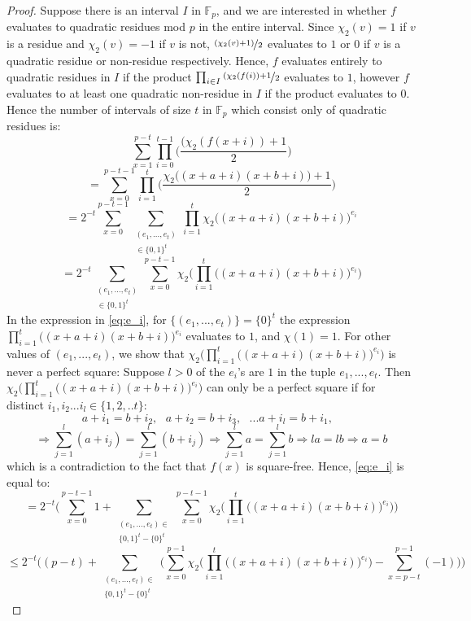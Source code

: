 \documentclass{report}
\begin{document}
\begin{proof}
Suppose there is an interval $I$ in $\mathbb{F}_p$, and we are interested in whether $f$ evaluates to quadratic residues mod $p$ in the entire interval. Since $\chi_2(v)=1$ if $v$ is a residue and $\chi_2(v)=-1$ if $v$ is not, $\nicefrac{(\chi_2(v)+1)}{2}$ evaluates to $1$ or $0$ if $v$ is a quadratic residue or non-residue respectively. Hence, $f$ evaluates entirely to quadratic residues in $I$ if the product $\prod_{i\in I}\nicefrac{(\chi_2(f(i))+1}{2}$ evaluates to $1$, however $f$ evaluates to at least one quadratic non-residue in $I$ if the product evaluates to $0$. Hence the number of intervals of size $t$ in $\mathbb{F}_p$ which consist only of quadratic residues is:
\[ \sum_{x=1}^{p-t}\prod_{i=0}^{t-1}\bigg(\frac{(\chi_2(f(x+i))+1}{2}\bigg) \]
\[ =\sum_{x=0}^{p-t-1}\prod_{i=1}^{t}\bigg(\frac{\chi_2\big((x+a+i)(x+b+i)\big)+1}{2}\bigg) \]
\[ =2^{-t}\sum_{x=0}^{p-t-1}\sum_{\substack{(e_1,...,e_{t})\\ \in\{0,1\}^{t}}}\prod_{i=1}^{t} \chi_2\big((x+a+i)(x+b+i)\big)^{e_i} \]
\begin{equation} \label{eq:e_i}
=2^{-t}\sum_{\substack{(e_1,...,e_{t})\\ \in\{0,1\}^t}}\sum_{x=0}^{p-t-1}\chi_2\Big(\prod_{i=1}^{t} \big((x+a+i)(x+b+i)\big)^{e_i}\Big)
\end{equation}
In the expression in \ref{eq:e_i}, for $\{(e_1,...,e_{t})\}=\{0\}^t$ the expression $\prod_{i=1}^{t} \big((x+a+i)(x+b+i)\big)^{e_i}$ evaluates to $1$, and $\chi(1)=1$. For other values of $(e_1,...,e_{t})$, we show that $\chi_2\Big(\prod_{i=1}^{t} \big((x+a+i)(x+b+i)\big)^{e_i}\Big)$ is never a perfect square: Suppose $l>0$ of the $e_i$'s are $1$ in the tuple $e_1,...,e_t$. Then $\chi_2\Big(\prod_{i=1}^{t} \big((x+a+i)(x+b+i)\big)^{e_i}\Big)$ can only be a perfect square if for distinct $i_1,i_2...i_l\in\{1,2,..t\}$:
\[ a+i_1=b+i_2,\text{ } a+i_2=b+i_3,\text{ } ... a+i_l=b+i_1,\text{ } \]
\[ \Rightarrow \sum_{j=1}^{l} (a + i_j)= \sum_{j=1}^{l} (b + i_j) \Rightarrow \sum_{j=1}^{l} a = \sum_{j=1}^{l} b \Rightarrow la = lb \Rightarrow a = b\]
which is a contradiction to the fact that $f(x)$ is square-free. Hence, \ref{eq:e_i} is equal to:
\[ =2^{-t}\bigg(\sum_{x=0}^{p-t-1}1+ \sum_{\substack{(e_1,...,e_{t})\in \\ \{0,1\}^t-\{0\}^t}} \sum_{x=0}^{p-t-1} \chi_2\Big(\prod_{i=1}^{t} \big((x+a+i)(x+b+i)\big)^{e_i}\Big)\bigg) \]
\[ \leq 2^{-t}\Bigg((p-t)+\sum_{\substack{(e_1,...,e_{t})\in \\ \{0,1\}^t-\{0\}^t}} \bigg(\sum_{x=0}^{p-1} \chi_2\Big(\prod_{i=1}^{t} \big((x+a+i)(x+b+i)\big)^{e_i}\Big)-\sum_{x=p-t}^{p-1}(-1) \bigg)\Bigg) \]

\end{proof}
\end{document}
